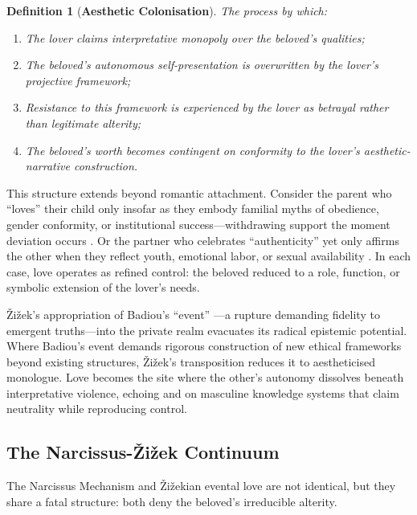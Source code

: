 \documentclass[11pt, a4paper, oneside]{article}
\theoremstyle{analytic}
\newtheorem{definition}{Definition}
\begin{document}
\begin{definition}[\textbf{Aesthetic Colonisation}]
The process by which:
\begin{enumerate}
    \item The lover claims interpretative monopoly over the beloved's qualities;
    \item The beloved's autonomous self-presentation is overwritten by the lover's projective framework;
    \item Resistance to this framework is experienced by the lover as betrayal rather than legitimate alterity;
    \item The beloved's worth becomes contingent on conformity to the lover's aesthetic-narrative construction.
\end{enumerate}
\end{definition}

This structure extends beyond romantic attachment. Consider the parent who ``loves'' their child only insofar as they embody familial myths of obedience, gender conformity, or institutional success---withdrawing support the moment deviation occurs \citep{connell2009}. Or the partner who celebrates ``authenticity'' yet only affirms the other when they reflect youth, emotional labor, or sexual availability \citep{hooks2001, illouz2012}. In each case, love operates as refined control: the beloved reduced to a role, function, or symbolic extension of the lover's needs.

Žižek's appropriation of Badiou's ``event'' \citep{badiou2005}---a rupture demanding fidelity to emergent truths---into the private realm evacuates its radical epistemic potential. Where Badiou's event demands rigorous construction of new ethical frameworks beyond existing structures, Žižek's transposition reduces it to aestheticised monologue. Love becomes the site where the other's autonomy dissolves beneath interpretative violence, echoing \citet{irigaray1985} and \citet{beauvoir1949} on masculine knowledge systems that claim neutrality while reproducing control.

\subsection{The Narcissus-Žižek Continuum}

The Narcissus Mechanism and Žižekian evental love are not identical, but they share a fatal structure: both deny the beloved's irreducible alterity.
\end{document}
